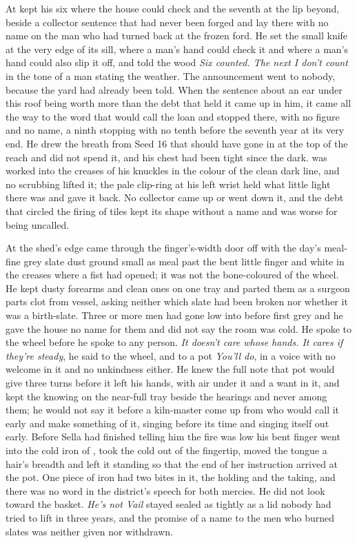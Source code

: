 \scenebreak

At   kept his six where the house could check and the seventh at the lip beyond, beside a collector sentence that had never been forged and lay there with no name on the man who had turned back at the frozen ford. He set the small knife at the very edge of its sill, where a man's hand could check it and where a man's hand could also slip it off, and told the wood \emph{Six counted. The next I don't count} in the tone of a man stating the weather. The announcement went to nobody, because the yard had already been told. When the sentence about an ear under this roof being worth more than the debt that held it came up in him, it came all the way to the word that would call the loan and stopped there, with no figure and no name, a ninth stopping with no tenth before the seventh year at its very end. He drew the breath from Seed 16 that should have gone in at the top of the reach and did not spend it, and his chest had been tight since the dark.  was worked into the creases of his knuckles in the colour of the clean dark line, and no scrubbing lifted it; the pale clip-ring at his left wrist held what little light there was and gave it back. No collector came up  or went down it, and the debt that circled the firing of tiles kept its shape without a name and was worse for being uncalled.

At the shed's edge  came through the finger's-width door off  with the day's meal-fine grey slate dust ground small as meal past the bent little finger and white in the creases where a fist had opened; it was not the bone-coloured  of the wheel. He kept dusty forearms and clean ones on one tray and parted them as a surgeon parts clot from vessel, asking neither which slate had been broken nor whether it was a birth-slate. Three or more men had gone low into  before first grey and he gave the house no name for them and did not say the room was cold. He spoke to the wheel before he spoke to any person. \emph{It doesn't care whose hands. It cares if they're steady}, he said to the wheel, and to a pot \emph{You'll do}, in a voice with no welcome in it and no unkindness either. He knew the full note that pot would give three turns before it left his hands, with air under it and a want in it, and kept the knowing on the near-full tray beside the hearings and never among them; he would not say it before a kiln-master come up from  who would call it early and make something of it, singing before its time and singing itself out early. Before Sella had finished telling him the fire was low his bent finger went into the cold iron of , took the cold out of the fingertip, moved the tongue a hair's breadth and left it standing so that the end of her instruction arrived at the pot. One piece of iron had two bites in it, the holding and the taking, and there was no word in the district's speech for both mercies. He did not look toward the basket. \emph{He's not Vail} stayed sealed as tightly as a lid nobody had tried to lift in three years, and the promise of a name to the men who burned slates was neither given nor withdrawn.

